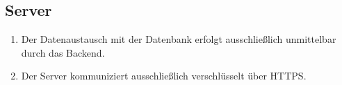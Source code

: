 \subsection*{Server}

\begin{samepage}
    \begin{enumerate}[label=\textbf{/NFS\arabic*0/}, align=left, start=7]
        \item Der \Gls{Datenaustausch} mit der \Gls{Datenbank} erfolgt ausschließlich unmittelbar durch das \Gls{Backend}.
        \item Der \Gls{Server} kommuniziert ausschließlich verschlüsselt über \Gls{HTTPS}.
    \end{enumerate}
\end{samepage}